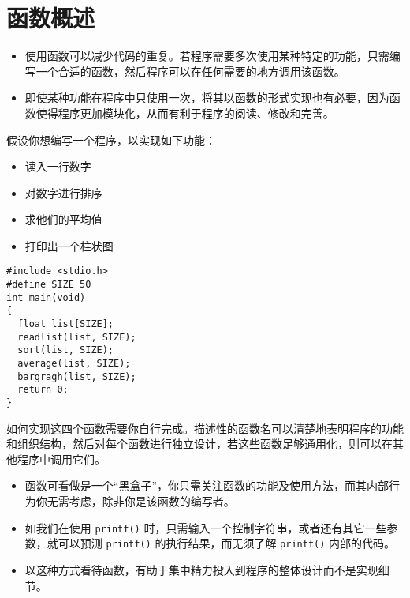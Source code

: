 \section{函数概述}

\begin{frame}
\begin{itemize}
\item 使用函数可以减少代码的重复。若程序需要多次使用某种特定的功能，只需编写一个合适的函数，然后程序可以在任何需要的地方调用该函数。\\[0.2in]
\item 即使某种功能在程序中只使用一次，将其以函数的形式实现也有必要，因为函数使得程序更加模块化，从而有利于程序的阅读、修改和完善。
\end{itemize}
\end{frame}

\begin{frame}
假设你想编写一个程序，以实现如下功能：\vspace{0.1in}

\begin{itemize}
\item  读入一行数字 \\[0.1in]
\item  对数字进行排序 \\[0.1in]
\item  求他们的平均值 \\[0.1in]
\item  打印出一个柱状图
\end{itemize}
\end{frame}

\begin{frame}[fragile]
\begin{lstlisting}[]
#include <stdio.h>
#define SIZE 50
int main(void)
{
  float list[SIZE];  
  readlist(list, SIZE);
  sort(list, SIZE);
  average(list, SIZE);
  bargragh(list, SIZE);  
  return 0;
}
\end{lstlisting}
\end{frame}

\begin{frame}[fragile]
如何实现这四个函数需要你自行完成。描述性的函数名可以清楚地表明程序的功能和组织结构，然后对每个函数进行独立设计，若这些函数足够通用化，则可以在其他程序中调用它们。
\end{frame}

\begin{frame}[fragile]
\begin{itemize}
\item
函数可看做是一个“黑盒子”，你只需关注函数的功能及使用方法，而其内部行为你无需考虑，除非你是该函数的编写者。\\[0.1in]
\item
如我们在使用 \lstinline|printf()| 时，只需输入一个控制字符串，或者还有其它一些参数，就可以预测 \lstinline|printf()| 的执行结果，而无须了解 \lstinline|printf()| 内部的代码。
\\[0.1in]
\item
以这种方式看待函数，有助于集中精力投入到程序的整体设计而不是实现细节。
\end{itemize}
\end{frame}


